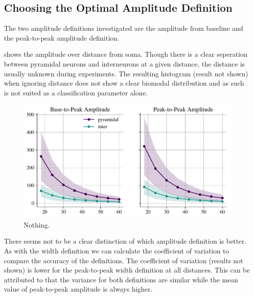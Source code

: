 \documentclass[altfont, fleqn]{uiophd}
\renewcommand{\Cref}[1]{{\color{viridis_03}\myCref{#1}}}
\begin{document}
\noindent
\newpage
\subsection{Choosing the Optimal Amplitude Definition}
The two amplitude definitions investigated are
the amplitude from baseline and 
the peak-to-peak amplitude definition.

\Cref{fig:4_amp_distance} shows the amplitude over distance from soma. 
Though there is a clear seperation between pyramidal neurons and interneurons
at a given distance, the distance is usually unknown during experiments. 
The resulting histogram (result not shown) when ignoring distance does not show a clear
biomodal distribution and as such is not suited as a
classification parameter alone. 

\begin{figure}[h]
    \begin{center}
        \includegraphics[width=\textwidth]{images/sec_4/int_pyr_amps_dist.pdf}
        \caption{
            Nothing.
        }
        \label{fig:4_amp_distance}
    \end{center}
\end{figure}

There seems not to be a clear distinction of which amplitude definition is better. 
As with the width definition we can calculate the coefficient of variation 
to compare the accuracy of the definitions. 
The coefficient of variation (results not shown) 
is lower for the peak-to-peak width definition at all distances.  
This can be attributed to that the variance for both definitions are similar 
while the mean value of peak-to-peak amplitude is always higher. 
\end{document}
